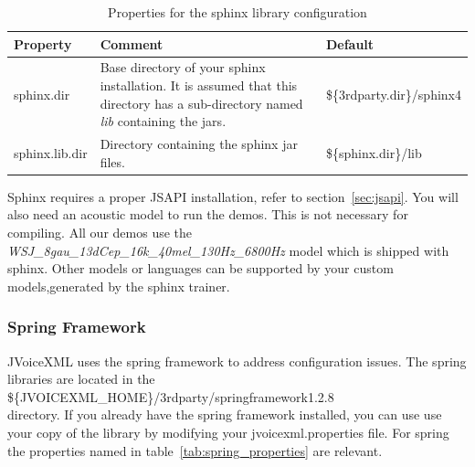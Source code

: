 \documentclass[11pt,a4paper]{article}
\begin{document}
\begin{table}[h]
\caption{Properties for the sphinx library configuration}
\label{tab:sphinx_properties}

\begin{center}

\begin{tabular}{|l|p{4cm}|l|}
\hline
\textbf{Property} & \textbf{Comment} & \textbf{Default} \\
\hline
\hline
sphinx.dir & 
Base directory of your sphinx installation.
It is assumed that this directory
has a sub-directory named \emph{lib} containing the jars.
& \$\{3rdparty.dir\}/sphinx4 \\
\hline
sphinx.lib.dir & 
Directory containing the sphinx jar files.
& \$\{sphinx.dir\}/lib \\
\hline
\end{tabular}

\end{center}

\end{table}

Sphinx requires a proper JSAPI installation, refer to section~\ref{sec:jsapi}.
You will also need an acoustic model to run the demos. This is not
necessary for compiling. All our demos use the 
\emph{WSJ\_8gau\_13dCep\_16k\_40mel\_130Hz\_6800Hz} model which is shipped
with sphinx. Other models or languages can be supported by your
custom models,generated by the sphinx trainer.


\subsubsection{Spring Framework}
\label{sec:spring-framework}

JVoiceXML uses the spring framework to address configuration
issues.
The spring libraries are located in the \\
\$\{JVOICEXML\_HOME\}/3rdparty/springframework1.2.8 \\
directory. If you already have the spring framework installed, you can use
use your copy of the library by modifying your jvoicexml.properties file.
For spring the properties named in 
table~\ref{tab:spring_properties} are 
relevant.
\end{document}
